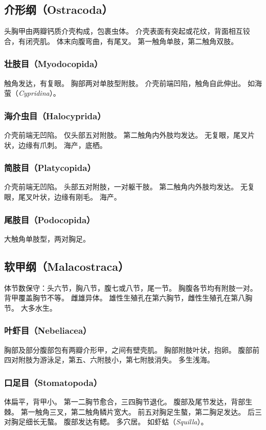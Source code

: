 \documentclass[11pt]{article}
\begin{document}
\subsection{介形纲（Ostracoda）}
头胸甲由两瓣钙质介壳构成，包裹虫体。
介壳表面有突起或花纹，背面相互铰合，有闭壳肌。
体末向腹弯曲，有尾叉。
第一触角单肢，第二触角双肢。

\subsubsection{壮肢目（Myodocopida）}
触角发达，有复眼。
胸部两对单肢型附肢。
介壳前端凹陷，触角自此伸出。
如海萤（\textit{Cypridina}）。

\subsubsection{海介虫目（Halocyprida）}
介壳前端无凹陷。
仅头部五对附肢。
第二触角内外肢均发达。
无复眼，尾叉片状，边缘有爪刺。
海产，底栖。

\subsubsection{简肢目（Platycopida）}
介壳前端无凹陷。
头部五对附肢，一对躯干肢。
第二触角内外肢均发达。
无复眼，尾叉叶状，边缘有刚毛。
海产。

\subsubsection{尾肢目（Podocopida）}
大触角单肢型，两对胸足。

\subsection{软甲纲（Malacostraca）}
体节数保守：头六节，胸八节，腹七或八节，尾一节。
胸腹各节均有附肢一对。
背甲覆盖胸节不等。
雌雄异体。
雄性生殖孔在第六胸节，雌性生殖孔在第八胸节。
大多水生。

\subsubsection{叶虾目（Nebeliacea）}
胸部及部分腹部包有两瓣介形甲，之间有壁壳肌。
胸部附肢叶状，抱卵。
腹部前四对附肢为游泳足，第五、六附肢小，第七附肢消失。
多生浅海。

\subsubsection{口足目（Stomatopoda）}
体扁平，背甲小。
第一二胸节愈合，三四胸节退化。
腹部及尾节发达，背部生棘。
第一触角三叉，第二触角鳞片宽大。
前五对胸足生螯，第二胸足发达。
后三对胸足细长无螯。
腹部发达有鳃。
多穴居。
如虾蛄（\textit{Squilla}）。
\end{document}
